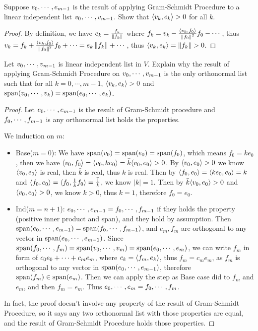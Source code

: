 \documentclass[../main.tex]{subfiles}
\begin{document}
\setcounter{exercise}{8}
\begin{exercise}
  Suppose $\join{e}{m - 1}$ is the result of applying Gram-Schmidt Procedure to
  a linear independent list $\join{v}{m - 1}$.
  Show that $\ip{v_k}{e_k} > 0$ for all $k$.
\end{exercise}
\begin{proof}
  By definition, we have
  $e_k = \frac{f_k}{\norm{f_k}}$ where $f_k = v_k - \frac{\ip{v_k}{f_0}}{\norm{f_0}^2} f_0 - \cdots$,
  thus $v_k = f_k + \frac{\ip{v_k}{f_0}}{\norm{f_0}^2} f_0 + \cdots = e_k \norm{f_k} + \cdots$,
  thus $\ip{v_k}{e_k} = \norm{f_k} > 0$.
\end{proof}

\begin{exercise}
  \label{E:Gram-Schmidt-Procedure-Uniqueness}
  Let $\join{v}{m - 1}$ is linear independent list in $V$.
  Explain why the result of applying Gram-Schmidt Procedure on $\join{v}{m - 1}$
  is the only orthonormal list such that for all $k = 0, \cdots, m - 1$,
  $\ip{v_k}{e_k} > 0$ and $\spanv(\join{v}{k}) = \spanv(\join{e}{k})$.
\end{exercise}
\begin{proof}
  Let $\join{e}{m - 1}$ is the result of Gram-Schmidt procedure
  and $\join{f}{m - 1}$ is any orthonormal list holds the properties.

  We induction on $m$:
  \begin{itemize}
    \item Base($m = 0$): We have $\spanv(v_0) = \spanv(e_0) = \spanv(f_0)$,
          which means $f_0 = k e_0$, then we have $\ip{v_0}{f_0} = \ip{v_0}{ke_0} = \bar{k} \ip{v_0}{e_0} > 0$.
          By $\ip{v_0}{e_0} > 0$ we know $\ip{v_0}{e_0}$ is real, then $\bar{k}$ is real,
          thus $k$ is real.
          Then by $\ip{f_0}{e_0} = \ip{ke_0}{e_0} = k$ and
          $\ip{f_0}{e_0} = \ip{f_0}{\frac{1}{k}f_0} = \bar{\frac{1}{k}}$, we know $|k| = 1$.
          Then by $\bar{k}\ip{v_0}{e_0} > 0$ and $\ip{v_0}{e_0} > 0$, we know $k > 0$, thus $k = 1$,
          therefore $f_0 = e_0$.
    \item Ind($m = n + 1$): $\join{e}{m - 1} = \join{f}{m - 1}$ if they holds the property (positive inner product and span),
          and they hold by assumption. Then $\spanv(\join{e}{m - 1}) = \spanv(\join{f}{m - 1})$,
          and $e_m, f_m$ are orthogonal to any vector in $\spanv(\join{e}{m - 1})$.
          Since $\spanv(\join{f}{m}) = \spanv(\join{v}{m}) = \spanv(\join{e}{m})$,
          we can write $f_m$ in form of $\joinp[+]{c}{e}{m}$, where $c_k = \ip{f_m}{e_k}$,
          thus $f_m = c_m e_m$, as $f_m$ is orthogonal to any vector in $\spanv(\join{e}{m - 1})$,
          therefore $\spanv(f_m) \in \spanv(e_m)$.
          Then we can apply the step as Base case did to $f_m$ and $e_m$,
          and then $f_m = e_m$. Thus $\join{e}{m} = \join{f}{m}$.
  \end{itemize}

  In fact, the proof doesn't involve any property of the result of Gram-Schmidt Procedure,
  so it says any two orthonormal list with those properties are equal, and
  the result of Gram-Schmidt Procedure holds those properties.
\end{proof}
\end{document}
